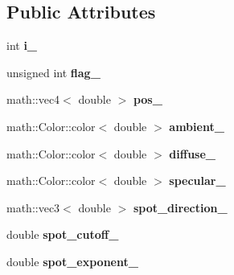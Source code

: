 \subsection*{\-Public \-Attributes}
\begin{DoxyCompactItemize}
\item 
\hypertarget{classglutpp_1_1light_1_1raw_a389bc9abc3833ee2b0ad9f586eb6b130}{int {\bfseries i\-\_\-}}\label{classglutpp_1_1light_1_1raw_a389bc9abc3833ee2b0ad9f586eb6b130}

\item 
\hypertarget{classglutpp_1_1light_1_1raw_a23186cbd578307e19e25de70506bf685}{unsigned int {\bfseries flag\-\_\-}}\label{classglutpp_1_1light_1_1raw_a23186cbd578307e19e25de70506bf685}

\item 
\hypertarget{classglutpp_1_1light_1_1raw_a4ee6c818d16ba1907575c8113fe77d62}{math\-::vec4$<$ double $>$ {\bfseries pos\-\_\-}}\label{classglutpp_1_1light_1_1raw_a4ee6c818d16ba1907575c8113fe77d62}

\item 
\hypertarget{classglutpp_1_1light_1_1raw_a6e1de5922bb65113dd176dda60312c83}{math\-::\-Color\-::color$<$ double $>$ {\bfseries ambient\-\_\-}}\label{classglutpp_1_1light_1_1raw_a6e1de5922bb65113dd176dda60312c83}

\item 
\hypertarget{classglutpp_1_1light_1_1raw_a0c0a3bc332e06b7210fce32401da2aa3}{math\-::\-Color\-::color$<$ double $>$ {\bfseries diffuse\-\_\-}}\label{classglutpp_1_1light_1_1raw_a0c0a3bc332e06b7210fce32401da2aa3}

\item 
\hypertarget{classglutpp_1_1light_1_1raw_a9fc07b70dc8063a6ff5a41d68805e589}{math\-::\-Color\-::color$<$ double $>$ {\bfseries specular\-\_\-}}\label{classglutpp_1_1light_1_1raw_a9fc07b70dc8063a6ff5a41d68805e589}

\item 
\hypertarget{classglutpp_1_1light_1_1raw_a662c16441e5d75558b67844791b2659f}{math\-::vec3$<$ double $>$ {\bfseries spot\-\_\-direction\-\_\-}}\label{classglutpp_1_1light_1_1raw_a662c16441e5d75558b67844791b2659f}

\item 
\hypertarget{classglutpp_1_1light_1_1raw_af27668a3d72b3d7a93cc0ed090485f61}{double {\bfseries spot\-\_\-cutoff\-\_\-}}\label{classglutpp_1_1light_1_1raw_af27668a3d72b3d7a93cc0ed090485f61}

\item 
\hypertarget{classglutpp_1_1light_1_1raw_ad752c25c478b49bec77c2a504d1e120e}{double {\bfseries spot\-\_\-exponent\-\_\-}}\label{classglutpp_1_1light_1_1raw_ad752c25c478b49bec77c2a504d1e120e}


\end{DoxyCompactItemize}
